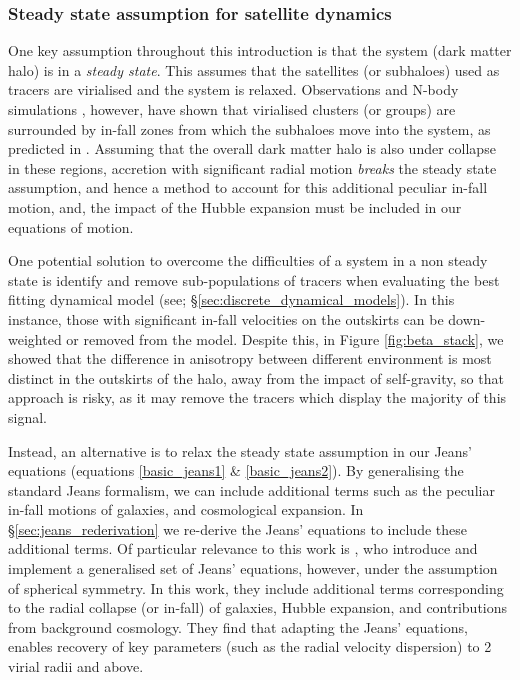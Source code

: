 \subsubsection{Steady state assumption for satellite dynamics}
One key assumption throughout this introduction is that the system (dark matter halo) is in a \textit{steady state}. This assumes that the satellites (or subhaloes) used as tracers are virialised and the system is relaxed. Observations \citep[e.g.][]{mamon2005} and N-body simulations \citep[e.g.][]{mahajan2011}, however, have shown that virialised clusters (or groups) are surrounded by in-fall zones from which the subhaloes move into the system, as predicted in \citet{gunn1972}. Assuming that the overall dark matter halo is also under collapse in these regions, accretion with significant radial motion \textit{breaks} the steady state assumption, and hence a method to account for this additional peculiar in-fall motion, and, the impact of the Hubble expansion must be included in our equations of motion.

One potential solution to overcome the difficulties of a system in a non steady state is identify and remove sub-populations of tracers when evaluating the best fitting dynamical model (see; \S\ref{sec:discrete_dynamical_models}). In this instance, those with significant in-fall velocities on the outskirts can be down-weighted or removed from the model. Despite this, in Figure \ref{fig:beta_stack}, we showed that the difference in anisotropy between different environment is most distinct in the outskirts of the halo, away from the impact of self-gravity, so that approach is risky, as it may remove the tracers which display the majority of this signal.

Instead, an alternative is to relax the steady state assumption in our Jeans' equations (equations \ref{basic_jeans1} \& \ref{basic_jeans2}). By generalising the standard Jeans formalism, we can include additional terms such as the peculiar in-fall motions of galaxies, and cosmological expansion. In \S\ref{sec:jeans_rederivation} we re-derive the Jeans' equations to include these additional terms. Of particular relevance to this work is \citet{falco2013}, who introduce and implement a generalised set of Jeans' equations, however, under the assumption of spherical symmetry. In this work, they include additional terms corresponding to the radial collapse (or in-fall) of galaxies, Hubble expansion, and contributions from background cosmology. They find that adapting the Jeans' equations, enables recovery of key parameters (such as the radial velocity dispersion) to 2 virial radii and above. 

